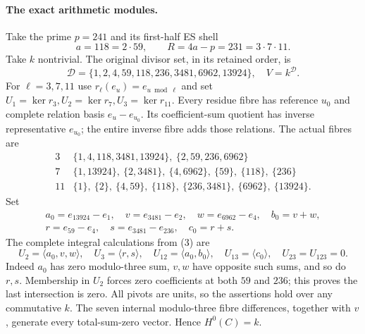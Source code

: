 \documentclass[10pt,a4paper]{article}
\begin{document}
\paragraph{The exact arithmetic modules.}
Take the prime $p=241$ and its first-half ES shell
\[
 a=118=2\cdot59,\qquad R=4a-p=231=3\cdot7\cdot11.
\]
Take $k$ nontrivial. The original divisor set, in its retained order, is
\[
 \mathcal D=\{1,2,4,59,118,236,3481,6962,13924\},\quad V=k^{\mathcal D}.
\]
For $\ell=3,7,11$ use $r_\ell(e_u)=e_{u\bmod\ell}$ and set
$U_1=\ker r_3,U_2=\ker r_7,U_3=\ker r_{11}$.
Every residue fibre has reference $u_0$ and complete relation basis
$e_u-e_{u_0}$. Its coefficient-sum quotient has inverse representative
$e_{u_0}$; the entire inverse fibre adds those relations.
The actual fibres are
\[
\begin{array}{c|l}
3&\{1,4,118,3481,13924\},\ \{2,59,236,6962\}\\
7&\{1,13924\},\ \{2,3481\},\ \{4,6962\},\ \{59\},\ \{118\},\ \{236\}\\
11&\{1\},\ \{2\},\ \{4,59\},\ \{118\},\ \{236,3481\},\ \{6962\},\ \{13924\}.
\end{array}                                                   \tag{3}
\]
Set
\[
\begin{gathered}
 a_0=e_{13924}-e_1,\quad v=e_{3481}-e_2,\quad w=e_{6962}-e_4,
 \quad b_0=v+w,\\
 r=e_{59}-e_4,\quad s=e_{3481}-e_{236},\quad c_0=r+s.
\end{gathered}
\]
The complete integral calculations from (3) are
\[
 U_2=\langle a_0,v,w\rangle,\quad U_3=\langle r,s\rangle,
\quad U_{12}=\langle a_0,b_0\rangle,\quad U_{13}=\langle c_0\rangle,
\quad U_{23}=U_{123}=0.                                    \tag{4}
\]
Indeed $a_0$ has zero modulo-three sum, $v,w$ have opposite such sums,
and so do $r,s$. Membership in $U_2$ forces zero coefficients at both
$59$ and $236$; this proves the last intersection is zero. All pivots are
units, so the assertions hold over any commutative $k$.
The seven internal modulo-three fibre differences, together with $v$,
generate every total-sum-zero vector. Hence $H^0(C)=k$.
\end{document}
